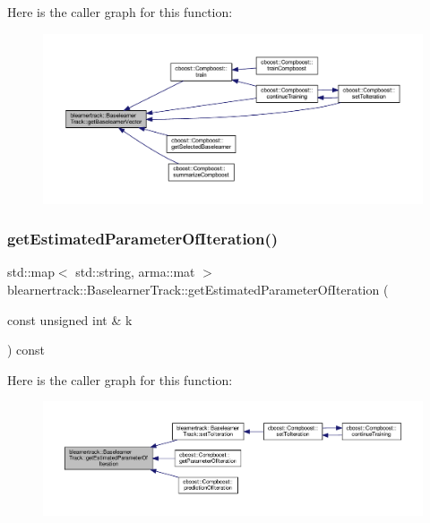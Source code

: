 Here is the caller graph for this function\+:\nopagebreak
\begin{figure}[H]
\begin{center}
\leavevmode
\includegraphics[width=350pt]{classblearnertrack_1_1_baselearner_track_a596429982bd5fb1c8ffabc5f93849235_icgraph}
\end{center}
\end{figure}
\mbox{\label{classblearnertrack_1_1_baselearner_track_a9b0678ef3573206959be2068d115c556}} 
\subsubsection{\texorpdfstring{get\+Estimated\+Parameter\+Of\+Iteration()}{getEstimatedParameterOfIteration()}}
{\footnotesize\ttfamily std\+::map$<$ std\+::string, arma\+::mat $>$ blearnertrack\+::\+Baselearner\+Track\+::get\+Estimated\+Parameter\+Of\+Iteration (\begin{DoxyParamCaption}\item[{const unsigned int \&}]{k }\end{DoxyParamCaption}) const}

Here is the caller graph for this function\+:\nopagebreak
\begin{figure}[H]
\begin{center}
\leavevmode
\includegraphics[width=350pt]{classblearnertrack_1_1_baselearner_track_a9b0678ef3573206959be2068d115c556_icgraph}
\end{center}
\end{figure}
\mbox{\label{classblearnertrack_1_1_baselearner_track_a0ba8e3943b998b58375b892f40f12c73}} 
